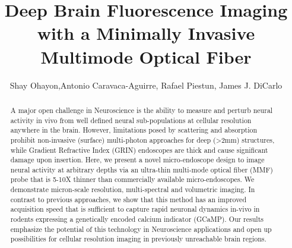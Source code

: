 \documentclass[10pt]{article}
\begin{document}
\title{Deep Brain Fluorescence Imaging with a Minimally Invasive Multimode Optical Fiber}

\author{Shay Ohayon,Antonio Caravaca-Aguirre, Rafael Piestun, James J. DiCarlo }

\address{McGovern Institute for Brain Research, Massachusetts Institute of Technology, 43 Vassar Street, Cambridge, MA 02139, USA\\
Department of Brain and Cognitive Sciences, Massachusetts Institute of Technology, 77 Massachusetts Ave, Cambridge, MA 02139, USA\\
Department of Electrical, Computer and Energy Engineering, University of Colorado, Boulder, Colorado 80309, USA}



\begin{abstract}
A major open challenge in Neuroscience is the ability to
measure and perturb neural activity in vivo from well defined
neural sub-populations at cellular resolution
anywhere in the brain. However, limitations posed by
scattering and absorption prohibit non-invasive (surface)
multi-photon approaches for deep (>2mm) structures,
while Gradient Refractive Index (GRIN) endoscopes are
thick and cause significant damage upon insertion. Here, we
present a novel micro-endoscope design to image neural
activity at arbitrary depths via an ultra-thin multi-mode
optical fiber (MMF) probe that is 5-10X thinner than
commercially available micro-endoscopes. We demonstrate
micron-scale resolution, multi-spectral and volumetric
imaging. In contrast to previous approaches, we show
that this method has an improved acquisition speed that is
sufficient to capture rapid neuronal dynamics in-vivo in
rodents expressing a genetically encoded calcium indicator (GCaMP).
Our results emphasize the potential of this technology in
Neuroscience applications and open up possibilities for
cellular resolution imaging in previously unreachable brain
regions.
\end{abstract}




\end{document}
